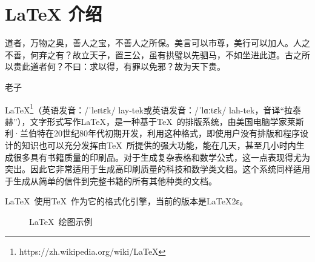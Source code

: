 \chapter{\LaTeX{} 介绍}
\epigraph{道者，万物之奥，善人之宝，不善人之所保。美言可以市尊，美行可以加人。人之不善，何弃之有？故立天子，置三公，虽有拱璧以先驷马，不如坐进此道。古之所以贵此道者何？不曰：求以得，有罪以免邪？故为天下贵。}{老子}

\LaTeX\footnote{https://zh.wikipedia.org/wiki/LaTeX}（英语发音：/ˈleɪtɛk/ lay-tek或英语发音：/ˈlɑːtɛk/ lah-tek，音译“拉泰赫”），文字形式写作\LaTeX ，是一种基于\TeX\ 的排版系统，由美国电脑学家莱斯利·兰伯特在20世纪80年代初期开发，利用这种格式\cite{pedroni2013structural}，即使用户没有排版和程序设计的知识也可以充分发挥由\TeX\ 所提供的强大功能，能在几天，甚至几小时内生成很多具有书籍质量的印刷品。对于生成复杂表格和数学公式，这一点表现得尤为突出。因此它非常适用于生成高印刷质量的科技和数学类文档。这个系统同样适用于生成从简单的信件到完整书籍的所有其他种类的文档。

\LaTeX\ 使用\TeX\ 作为它的格式化引擎，当前的版本是\LaTeX 2ε。
\begin{figure}[htbp]
    \centering
\caption{\LaTeX\ 绘图示例}
    \label{fig:mini:subfig} %
\end{figure}

